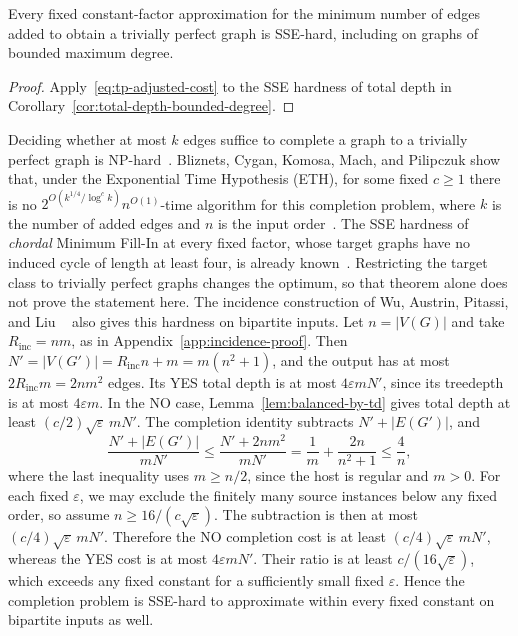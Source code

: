 \begin{theorem}\label{thm:tp-completion-sse}
Every fixed constant-factor approximation for the minimum number
of edges added to obtain a trivially perfect graph is \textup{SSE}-hard,
including on graphs of bounded maximum degree.
\end{theorem}

\begin{proof}
Apply~\eqref{eq:tp-adjusted-cost} to the \textup{SSE} hardness of total
depth in Corollary~\ref{cor:total-depth-bounded-degree}.
\end{proof}

Deciding whether at most $k$ edges suffice to complete a graph to a
trivially perfect graph is \textup{NP}-hard~\cite{Yannakakis1981,HogemoEtAl2021}.
Bliznets,
Cygan, Komosa, Mach, and Pilipczuk show that, under the Exponential
Time Hypothesis (ETH), for some
fixed $c\ge1$ there is no
$2^{O(k^{1/4}/\log^c k)}n^{O(1)}$-time algorithm for this completion
problem, where $k$ is the number of added edges and $n$ is the input
order~\cite[Theorem~1.1]{BliznetsEtAl2016}.
The \textup{SSE} hardness of \emph{chordal} Minimum Fill-In at every fixed factor,
whose target graphs have no induced cycle of length at least four,
is already known~\cite[Theorem~1.2]{APW}. Restricting the
target class to trivially perfect graphs changes the optimum, so
that theorem alone does not prove the statement here.
The incidence construction of Wu, Austrin, Pitassi, and Liu
~\cite[Sections~4.3 and~5]{APW} also gives this hardness on bipartite
inputs. Let $n=|V(G)|$ and take $R_{\mathrm{inc}}=nm$, as in
Appendix~\ref{app:incidence-proof}. Then $N'=|V(G')|=R_{\mathrm{inc}}n+m
=m(n^2+1)$, and the output has at most
$2R_{\mathrm{inc}}m=2nm^2$ edges. Its YES total depth is at most
$4\varepsilon mN'$, since its treedepth is at most $4\varepsilon m$.
In the NO case, Lemma~\ref{lem:balanced-by-td} gives total depth at
least $(c/2)\sqrt{\varepsilon}\,mN'$. The completion identity
subtracts $N'+|E(G')|$, and
\[
 \frac{N'+|E(G')|}{mN'}
 \leq \frac{N'+2nm^2}{mN'}
 =\frac1m+\frac{2n}{n^2+1}
 \leq \frac4n,
\]
where the last inequality uses $m\geq n/2$, since the host is
regular and $m>0$. For each fixed $\varepsilon$, we may exclude the
finitely many source instances below any fixed order, so assume
$n\geq16/(c\sqrt{\varepsilon})$. The subtraction is then at most
$(c/4)\sqrt{\varepsilon}\,mN'$. Therefore the NO completion cost is
at least $(c/4)\sqrt{\varepsilon}\,mN'$, whereas the YES cost is at
most $4\varepsilon mN'$. Their ratio is at least
$c/(16\sqrt{\varepsilon})$, which exceeds any fixed constant for a
sufficiently small fixed $\varepsilon$. Hence the completion problem
is \textup{SSE}-hard to approximate within every fixed constant on bipartite
inputs as well.


